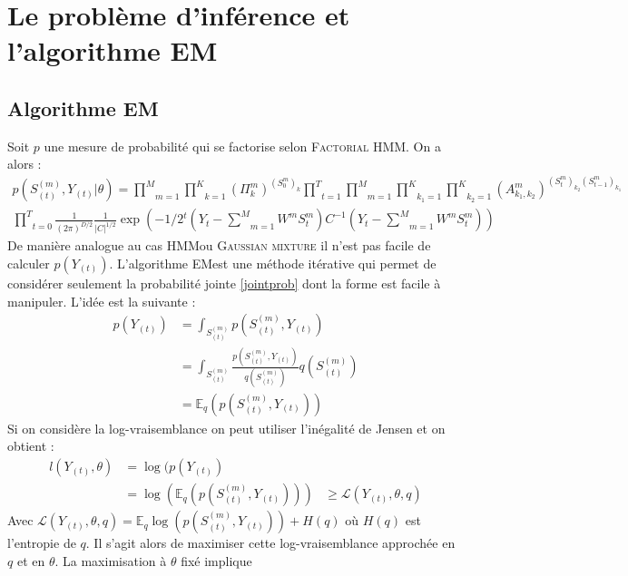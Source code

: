 \documentclass[10pt,a4paper]{article}
\newcommand{\hmm}{\textsc{HMM}}
\newcommand{\fhmm}{\textsc{Factorial HMM}}
\newcommand{\EM}{\textsc{EM}}
\begin{document}
\section{Le problème d'inférence et l'algorithme EM}
\subsection{Algorithme EM}
Soit $p$ une mesure de probabilité qui se factorise selon \fhmm. On a alors :
\begin{multline}
p(S_{(t)}^{(m)},Y_{(t)} \vert \theta)=\underset{m=1}{\overset{M}{\prod}}\underset{k=1}{\overset{K}{\prod}}(\Pi_k^m)^{(S_0^m)_k}\underset{t=1}{\overset{T}{\prod}}\underset{m=1}{\overset{M}{\prod}}\underset{k_1=1}{\overset{K}{\prod}}\underset{k_2=1}{\overset{K}{\prod}}(A_{k_1,k_2}^m)^{(S_t^m)_{k_2}(S_{t-1}^m)_{k_1}}\\ \underset{t=0}{\overset{T}{\prod}}\frac{1}{(2\pi)^{D/2}}\frac{1}{\vert C  \vert^{1/2}}\exp\left(-1/2 {}^t\left(Y_t- \underset{m=1}{\overset{M}{\sum}}W^m S_t^m \right)C^{-1} \left(Y_t- \underset{m=1}{\overset{M}{\sum}}W^m S_t^m \right)\right) \label{jointprob}
\end{multline}
De manière analogue au cas \hmm ou \textsc{Gaussian mixture} il n'est pas facile de calculer $p(Y_{(t)})$. L'algorithme \EM est une méthode itérative qui permet de considérer seulement la probabilité jointe \ref{jointprob} dont la forme est facile à manipuler. L'idée est la suivante :
\begin{equation}
\begin{aligned}
p(Y_{(t)})&=\int_{S_{(t)}^{(m)}}p(S_{(t)}^{(m)},Y_{(t)}) \\
&=\int_{S_{(t)}^{(m)}}\frac{p(S_{(t)}^{(m)},Y_{(t)})}{q(S_{(t)}^{(m)})}q(S_{(t)}^{(m)}) \\
&=\mathbb{E}_q\left(p(S_{(t)}^{(m)},Y_{(t)}) \right)
\end{aligned}
\end{equation}
Si on considère la log-vraisemblance on peut utiliser l'inégalité de Jensen et on obtient :
\begin{equation}
\begin{aligned}
l(Y_{(t)},\theta)&=\log(p(Y_{(t)}) \\
&=\log\left( \mathbb{E}_q\left(p(S_{(t)}^{(m)},Y_{(t)}) \right) \right)
&\ge \mathcal{L}(Y_{(t)},\theta,q)
\end{aligned}
\end{equation}
Avec $\mathcal{L}(Y_{(t)},\theta,q)=\mathbb{E}_q \log \left( p(S_{(t)}^{(m)}, Y_{(t)})\right)+H(q)$ où $H(q)$ est l'entropie de $q$. Il s'agit alors de maximiser cette log-vraisemblance approchée en $q$ et en $\theta$. La maximisation à $\theta$ fixé implique 
\end{document}
